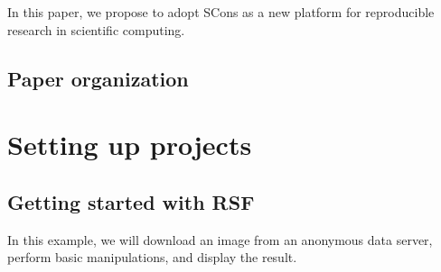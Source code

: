 In this paper, we propose to adopt SCons as a new platform for
reproducible research in scientific computing.

\subsection{Paper organization}


\newpage
\section{Setting up projects}
\subsection{Getting started with RSF}

In this example, we will download an image from an anonymous data
server, perform basic manipulations, and display the result.


